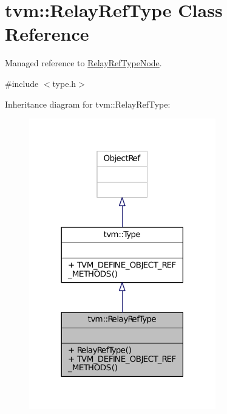 \hypertarget{classtvm_1_1RelayRefType}{}\section{tvm\+:\+:Relay\+Ref\+Type Class Reference}
\label{classtvm_1_1RelayRefType}


Managed reference to \hyperlink{classtvm_1_1RelayRefTypeNode}{Relay\+Ref\+Type\+Node}.  




{\ttfamily \#include $<$type.\+h$>$}



Inheritance diagram for tvm\+:\+:Relay\+Ref\+Type\+:
\nopagebreak
\begin{figure}[H]
\begin{center}
\leavevmode
\includegraphics[width=230pt]{classtvm_1_1RelayRefType__inherit__graph}
\end{center}
\end{figure}


